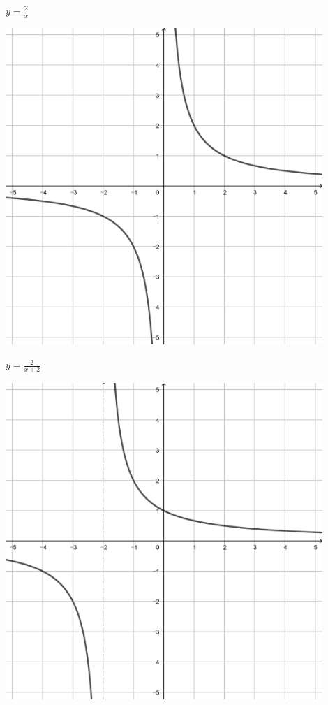 \documentclass[a4paper]{oblivoir}
\begin{document}
\clearpage
\begin{minipage}{0.45\textwidth}\centering
\(y=\frac2x\)
\par\bigskip\includegraphics[width=0.9\textwidth]{img/19-1}
\end{minipage}
\begin{minipage}{0.45\textwidth}\centering
\(y=\frac2{x+2}\)
\par\bigskip\includegraphics[width=0.9\textwidth]{img/19-2}
\end{minipage}\bigskip\bigskip\par
\end{document}
